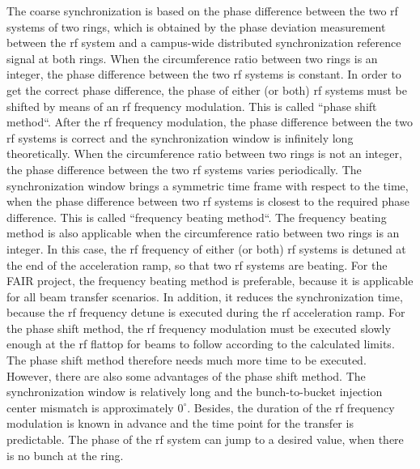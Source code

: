 The coarse synchronization is based on the phase difference between the two rf systems of two rings, which is obtained by the phase deviation measurement between the rf system and a campus-wide distributed synchronization reference signal at both rings. When the circumference ratio between two rings is an integer, the phase difference between the two rf systems is constant. In order to get the correct phase difference, the phase of either (or both) rf systems must be shifted by means of an rf frequency modulation. This is called ``phase shift method``. After the rf frequency modulation, the phase difference between the two rf systems is correct and the synchronization window is infinitely long theoretically. When the circumference ratio between two rings is not an integer, the phase difference between the two rf systems varies periodically. The synchronization window brings a symmetric time frame with respect to the time, when the phase difference between two rf systems is closest to the required phase difference. This is called ``frequency beating method``. The frequency beating method is also applicable when the circumference ratio between two rings is an integer. In this case, the rf frequency of either (or both) rf systems is detuned at the end of the acceleration ramp, so that two rf systems are beating. For the FAIR project, the frequency beating method is preferable, because it is applicable for all beam transfer scenarios. In addition, it reduces the synchronization time, because the rf frequency detune is executed during the rf acceleration ramp. For the phase shift method, the rf frequency modulation must be executed slowly enough at the rf flattop for beams to follow according to the calculated limits. The phase shift method therefore needs much more time to be executed. However, there are also some advantages of the phase shift method. The synchronization window is relatively long and the bunch-to-bucket injection center mismatch is approximately $0^\circ$. Besides, the duration of the rf frequency modulation is known in advance and the time point for the transfer is predictable. The phase of the rf system can jump to a desired value, when there is no bunch at the ring.  



